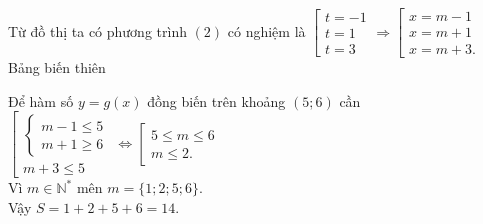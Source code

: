 \begin{ex}
{\begin{center}
\end{center}
Từ đồ thị ta có phương trình $(2)$ có nghiệm là $\left[\begin{array}{l}
t=-1\\t=1\\t=3
\end{array}\right. \Rightarrow \left[\begin{array}{l}
x=m-1\\x=m+1\\x=m+3.
\end{array}\right.$\\
Bảng biến thiên
\begin{center}
\end{center}
Để hàm số $y=g(x)$ đồng biến trên khoảng $(5;6)$ cần $\left[\begin{array}{l}
\begin{cases}
m-1 \leq 5\\m+1 \geq 6
\end{cases}\\
m+3 \leq 5
\end{array}\right. \Leftrightarrow \left[\begin{array}{l}
5 \leq m \leq 6\\
m \leq 2.
\end{array}\right.$\\
Vì $m \in \mathbb{N^{*}}$ mên $m = \{1;2;5;6\}$.\\
Vậy $S=1+2+5+6=14$.
}


\end{ex}

